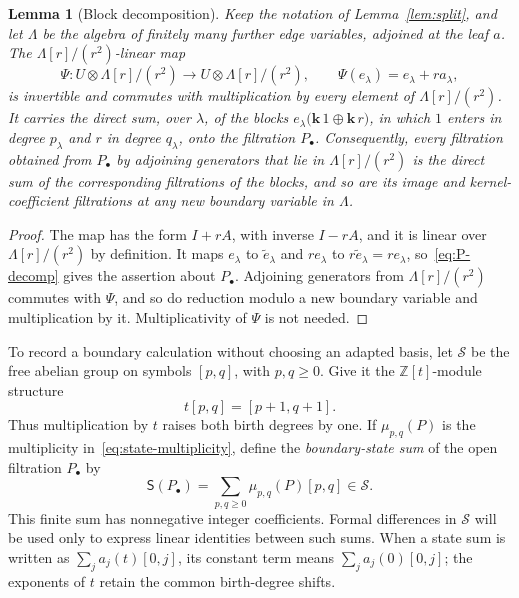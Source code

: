 \documentclass[reqno]{article}
\theoremstyle{plain} %
\newtheorem{lemma}[theorem]{Lemma}
\theoremstyle{definition}
\theoremstyle{remark}
\newcommand{\Z}{{\mathbb{Z}}}
\newcommand{\K} {\mathbf{k}}
\numberwithin{equation}{section}
\begin{document}
\begin{lemma}[Block decomposition]\label{lem:block}
Keep the notation of Lemma~\ref{lem:split}, and let $\Lambda$ be the
algebra of finitely many further edge variables, adjoined at the leaf
$a$. The $\Lambda[r]/(r^2)$-linear map
\[
\Psi\colon U\otimes\Lambda[r]/(r^2)\longrightarrow U\otimes\Lambda[r]/(r^2),
\qquad \Psi(e_\lambda)=e_\lambda+ra_\lambda,
\]
is invertible and commutes with multiplication by every element of
$\Lambda[r]/(r^2)$. It carries the direct sum, over $\lambda$, of the
blocks $e_\lambda\bigl(\K\,1\oplus\K\,r\bigr)$, in which $1$ enters
in degree $p_\lambda$ and $r$ in degree $q_\lambda$, onto the
filtration $P_\bullet$. Consequently, every filtration obtained from
$P_\bullet$ by adjoining generators that lie in $\Lambda[r]/(r^2)$ is
the direct sum of the corresponding filtrations of the blocks, and so
are its image and kernel-coefficient filtrations at any new boundary
variable in $\Lambda$.
\end{lemma}
\begin{proof}
The map has the form $I+rA$, with inverse $I-rA$, and it is linear over
$\Lambda[r]/(r^2)$ by definition. It maps $e_\lambda$ to
$\widetilde e_\lambda$ and $re_\lambda$ to $r\widetilde e_\lambda=re_\lambda$,
so~\eqref{eq:P-decomp} gives the assertion about $P_\bullet$. Adjoining
generators from $\Lambda[r]/(r^2)$ commutes with $\Psi$, and so do
reduction modulo a new boundary variable and multiplication by it.
Multiplicativity of $\Psi$ is not needed.
\end{proof}

To record a boundary calculation without choosing an adapted basis,
let $\mathcal S$ be the free abelian group on symbols $[p,q]$, with
$p,q\ge0$. Give it the $\Z[t]$-module structure
\[
 t[p,q]=[p+1,q+1].
\]
Thus multiplication by $t$ raises both birth degrees by one. If
$\mu_{p,q}(P)$ is the multiplicity in~\eqref{eq:state-multiplicity},
define the \emph{boundary-state sum} of the open filtration $P_\bullet$ by
\begin{equation}\label{eq:boundary-state-sum}
 \mathsf S(P_\bullet)=\sum_{p,q\ge0}\mu_{p,q}(P)[p,q]\in\mathcal S.
\end{equation}
This finite sum has nonnegative integer coefficients. Formal differences
in $\mathcal S$ will be used only to express linear identities between
such sums. When a state sum is written as $\sum_j a_j(t)[0,j]$, its
constant term means $\sum_j a_j(0)[0,j]$; the exponents of $t$ retain
the common birth-degree shifts.
\end{document}
